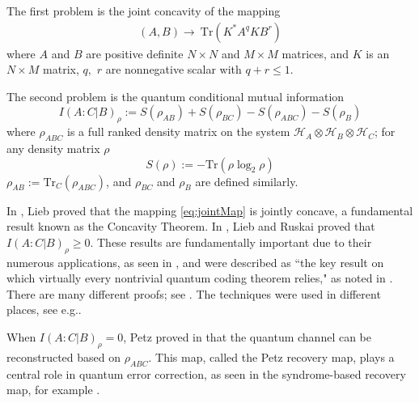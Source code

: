 \documentclass{article}
\numberwithin{equation}{section}
\begin{document}
The first problem is the joint concavity of the mapping 
\begin{align}\label{eq:jointMap}
  (A, B)\rightarrow\ \text{Tr} (K^* A^{q} K B^r)
\end{align} where $A$ and $B$ are positive definite $N\times N$ and $M\times M$ matrices, and $K$ is an $N \times M$ matrix, $q,$ $r$ are nonnegative scalar with $q + r \le 1$.

The second problem is the quantum conditional mutual information
\begin{equation}\label{def:mutual}
    I(A:C|B)_\rho := S(\rho_{AB}) + S(\rho_{BC}) - S(\rho_{ABC}) - S(\rho_B)
\end{equation}
where $\rho_{ABC}$ is a full ranked density matrix on the system $\mathcal{H}_A \otimes \mathcal{H}_B \otimes \mathcal{H}_C$; for any density matrix $\rho$
\begin{equation}
    S(\rho) := -\text{Tr}(\rho \log_2 \rho)
\end{equation}
$\rho_{AB} := \text{Tr}_C(\rho_{ABC})$, and $\rho_{BC}$ and $\rho_B$ are defined similarly.

In \cite{LIEB1973267}, Lieb proved that the mapping \eqref{eq:jointMap} is jointly concave, a fundamental result known as the Concavity Theorem. In \cite{LiebRuskai1973}, Lieb and Ruskai proved that $I(A: C|B)_\rho \ge 0$. These results are fundamentally important due to their numerous applications, as seen in \cite{ohya2004quantum, MRenes2022}, and were described as ``the key result on which virtually every nontrivial quantum coding theorem relies," as noted in \cite{LindenWinter2005}. There are many different proofs; see \cite{Ruskai2022,Ruskai2007,FawziSaunderson2017,simon2005trace, nielsen2004simple, Effros2009,Aujla2011, BeaudryRenner2012,Ismail2013}. The techniques were used in different places, see e.g.\cite{FrankLieb2013, FrankLieb2013b, CarlenFrankLieb2018, Hiai2013, Hiai2016}.

When $I(A:C|B)_\rho = 0$, Petz proved in \cite{Petz1986, Petz1988} that the quantum channel can be reconstructed based on $\rho_{ABC}$. This map, called the Petz recovery map, plays a central role in quantum error correction, as seen in the syndrome-based recovery map, for example \cite{BiswasEtc2024, biswas2025universal}.
\end{document}
